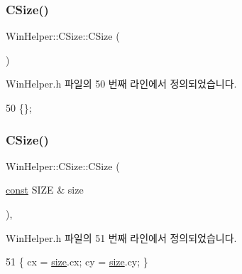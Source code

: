 \subsubsection{\texorpdfstring{C\+Size()}{CSize()}\hspace{0.1cm}{\footnotesize\ttfamily [1/3]}}
{\footnotesize\ttfamily Win\+Helper\+::\+C\+Size\+::\+C\+Size (\begin{DoxyParamCaption}{ }\end{DoxyParamCaption})\hspace{0.3cm}{\ttfamily [inline]}}



Win\+Helper.\+h 파일의 50 번째 라인에서 정의되었습니다.


\begin{DoxyCode}
50 \{\};
\end{DoxyCode}
\mbox{\label{class_win_helper_1_1_c_size_a1029bcc5ddd408e57f98841d286396f9}} 
\subsubsection{\texorpdfstring{C\+Size()}{CSize()}\hspace{0.1cm}{\footnotesize\ttfamily [2/3]}}
{\footnotesize\ttfamily Win\+Helper\+::\+C\+Size\+::\+C\+Size (\begin{DoxyParamCaption}\item[{\mbox{\hyperlink{getopt1_8c_a2c212835823e3c54a8ab6d95c652660e}{const}} S\+I\+ZE \&}]{size }\end{DoxyParamCaption})\hspace{0.3cm}{\ttfamily [inline]}, {\ttfamily [explicit]}}



Win\+Helper.\+h 파일의 51 번째 라인에서 정의되었습니다.


\begin{DoxyCode}
51 \{ cx = \mbox{\hyperlink{expr-lex_8cpp_ab7d671599a7b25ca99a487fa341bc33a}{size}}.cx; cy = \mbox{\hyperlink{expr-lex_8cpp_ab7d671599a7b25ca99a487fa341bc33a}{size}}.cy; \}
\end{DoxyCode}
\mbox{\label{class_win_helper_1_1_c_size_a69f59e4395efcfabd5ab7b6c3f212fce}} 
